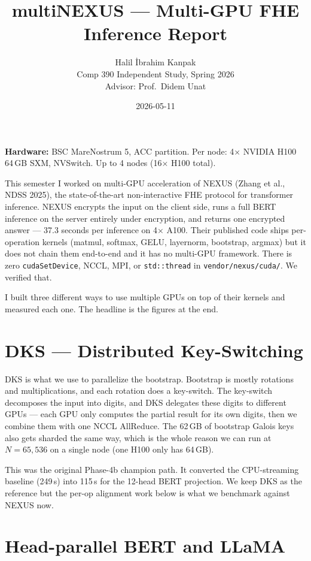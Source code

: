 \documentclass[11pt,a4paper]{article}
\title{multiNEXUS --- Multi-GPU FHE Inference Report}
\author{Halil İbrahim Kanpak \\
        Comp 390 Independent Study, Spring 2026 \\
        Advisor: Prof.\ Didem Unat}
\date{2026-05-11}
\begin{document}
\maketitle

\noindent\textbf{Hardware:} BSC MareNostrum 5, ACC partition. Per node: 4$\times$ NVIDIA H100 64\,GB SXM, NVSwitch. Up to 4 nodes (16$\times$ H100 total).

\bigskip

This semester I worked on multi-GPU acceleration of NEXUS (Zhang et al., NDSS 2025), the state-of-the-art non-interactive FHE protocol for transformer inference. NEXUS encrypts the input on the client side, runs a full BERT inference on the server entirely under encryption, and returns one encrypted answer --- 37.3 seconds per inference on 4$\times$ A100. Their published code ships per-operation kernels (matmul, softmax, GELU, layernorm, bootstrap, argmax) but it does not chain them end-to-end and it has no multi-GPU framework. There is zero \texttt{cudaSetDevice}, NCCL, MPI, or \texttt{std::thread} in \texttt{vendor/nexus/cuda/}. We verified that.

I built three different ways to use multiple GPUs on top of their kernels and measured each one. The headline is the figures at the end.

\section*{DKS --- Distributed Key-Switching}

DKS is what we use to parallelize the bootstrap. Bootstrap is mostly rotations and multiplications, and each rotation does a key-switch. The key-switch decomposes the input into digits, and DKS delegates these digits to different GPUs --- each GPU only computes the partial result for its own digits, then we combine them with one NCCL AllReduce. The 62\,GB of bootstrap Galois keys also gets sharded the same way, which is the whole reason we can run at $N=65{,}536$ on a single node (one H100 only has 64\,GB).

This was the original Phase-4b champion path. It converted the CPU-streaming baseline (249\,s) into 115\,s for the 12-head BERT projection. We keep DKS as the reference but the per-op alignment work below is what we benchmark against NEXUS now.

\section*{Head-parallel BERT and LLaMA}
\end{document}
